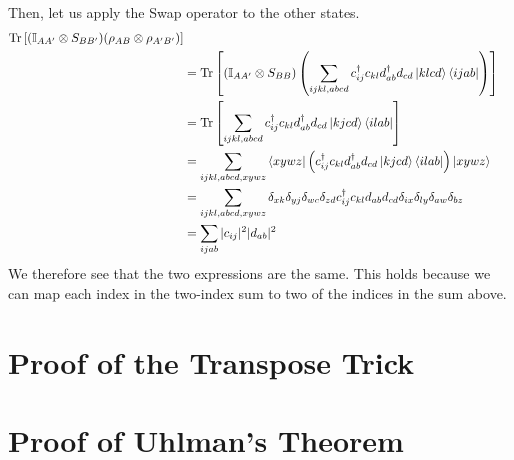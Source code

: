 Then, let us apply the Swap operator to the other states. 
\begin{align}
\mathrm{Tr}\left[( \mathbb{I}_{AA'} \otimes S_{BB'} )(\rho_{AB} \otimes \rho_{A'B'} ) \right] \nonumber \\
&= \mathrm{Tr}\left[(\mathbb{I}_{AA'} \otimes S_{BB} ) \left( \sum_{ijkl,abcd} c_{ij}^\dagger c_{kl} d^\dagger_{ab} d_{cd} \ket{klcd}\bra{ijab} \right)  \nonumber  \right] \\
&= \mathrm{Tr}\left[\sum_{ijkl,abcd} c_{ij}^\dagger c_{kl} d^\dagger_{ab} d_{cd} \ket{kjcd}\bra{ilab}  \right] \nonumber  \\
&= \sum_{ijkl,abcd,xywz} \bra{xywz} \left( c_{ij}^\dagger c_{kl} d^\dagger_{ab} d_{cd} \ket{kjcd}\bra{ilab}  \right) \ket{xywz} \nonumber \\
&= \sum_{ijkl,abcd,xywz} \delta_{xk} \delta_{yj} \delta_{wc} \delta_{zd} c_{ij}^\dagger c_{kl} d_{ab} d_{cd} \delta_{ix} \delta_{ly} \delta_{aw} \delta_{bz} \nonumber \\
&= \sum_{ijab} |c_{ij}|^2 |d_{ab}|^2 
\end{align}
We therefore see that the two expressions are the same. This holds because we can map each index in the two-index sum to two of the indices in the sum above. 

 
\section{Proof of the Transpose Trick}
\section{Proof of Uhlman's Theorem}

